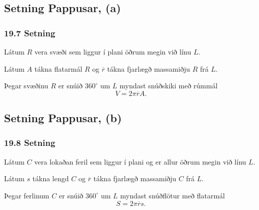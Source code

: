 \subsection[t]{Setning Pappusar, (a)}
 \subsubsection{19.7 Setning}
Látum $R$ vera svæði sem liggur í plani öðrum megin við línu $L$. \pause

\noindent
Látum $A$
tákna flatarmál $R$ og $\overline{r}$ tákna fjarlægð massamiðju $R$
frá $L$. \pause

\noindent
Þegar svæðinu $R$ er snúið $360^\circ$ um $L$ myndast
snúðskiki með rúmmál 
$$V=2\pi\overline{r}A.$$
 


\subsection[t]{Setning Pappusar, (b)}
 \subsubsection{19.8 Setning}
Látum $C$ vera lokaðan feril sem liggur í plani og er allur 
öðrum megin við línu $L$. \pause

\noindent
Látum $s$
tákna lengd $C$ og $\overline{r}$ tákna fjarlægð massamiðju $C$
frá $L$.  \pause

\noindent
Þegar ferlinum $C$ er snúið $360^\circ$ um $L$ myndast
snúðflötur með flatarmál 
$$S=2\pi\overline{r}s.$$
 


\subsection[t]{}
 \subsubsection{}
 
 




